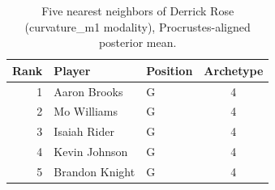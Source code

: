 \begin{table}[htbp]
  \centering\small
  \begin{tabular}{rllc}
    \toprule
    Rank & Player & Position & Archetype \\
    \midrule
    1 & Aaron Brooks & G & 4 \\
    2 & Mo Williams & G & 4 \\
    3 & Isaiah Rider & G & 4 \\
    4 & Kevin Johnson & G & 4 \\
    5 & Brandon Knight & G & 4 \\
    \bottomrule
  \end{tabular}
  \caption{Five nearest neighbors of Derrick Rose (curvature_m1 modality), Procrustes-aligned posterior mean.}
  \label{tab:Derrick_Rose_neighbors_curvature_m1}
\end{table}

